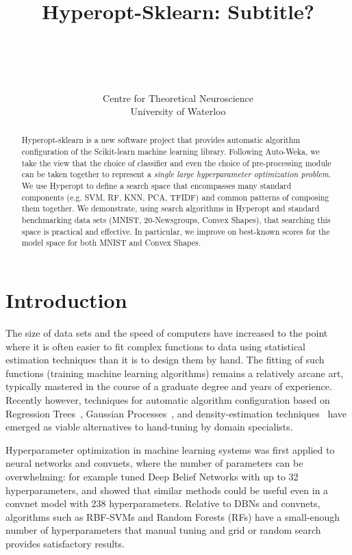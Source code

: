 \documentclass[wcp]{jmlr}
\title[Hyperopt-Sklearn]{Hyperopt-Sklearn: Subtitle?}
\author{
      \\
      \Name{Brent Komer} \Email{brent.komer@uwaterloo.ca}\\
      \Name{James Bergstra} \Email{james.bergstra@uwaterloo.ca}\\
      \Name{Chris Eliasmith} \Email{celiasmith@uwaterloo.ca}\\
      \addr Centre for Theoretical Neuroscience\\University of Waterloo\\
  }
\begin{document}
\maketitle

\begin{abstract}
    Hyperopt-sklearn is a new software project that provides automatic algorithm configuration of the Scikit-learn machine learning library.
    Following Auto-Weka, we take the view that the choice of classifier and even the choice of pre-processing module can be taken together to represent a {\em single large hyperparameter optimization problem}.
    We use Hyperopt to define a search space that encompasses many standard components (e.g. SVM, RF, KNN, PCA, TFIDF) and common patterns of composing them together.
    We demonstrate, using search algorithms in Hyperopt and standard benchmarking data sets (MNIST, 20-Newsgroups, Convex Shapes), that searching this space is practical and effective.
    In particular, we improve on best-known scores for the model space for both MNIST and Convex Shapes.
\end{abstract}

\section{Introduction}
\label{sec:intro}

The size of data sets and the speed of computers have increased to the point where it is often easier to fit complex functions to data using statistical estimation techniques than it is to design them by hand.
The fitting of such functions (training machine learning algorithms) remains a relatively arcane art, typically mastered in the course of a graduate degree and years of experience.
Recently however, techniques for automatic algorithm configuration based on
Regression Trees~\citep{hutter+hoos+leyton-brown:2011},
Gaussian Processes~\citep{MoTiZi78,snoek+larochelle+adams:2012nips},
and density-estimation techniques~\citep{bergstra+bardenet+bengio+kegl:2011}
have emerged as viable alternatives to hand-tuning by domain specialists.

Hyperparameter optimization in machine learning systems was first applied to neural networks and convnets, where the number of parameters can be overwhelming:
for example \citet{bergstra+bardenet+bengio+kegl:2011} tuned Deep Belief Networks with up to 32 hyperparameters,
and \citet{bergstra+yamins+cox:2013} showed that similar methods could be useful even in a convnet model with 238 hyperparameters.
Relative to DBNs and convnets, algorithms such as RBF-SVMs and Random Forests (RFs) have a small-enough number of hyperparameters that manual tuning and grid or random search provides satisfactory results.
\end{document}
